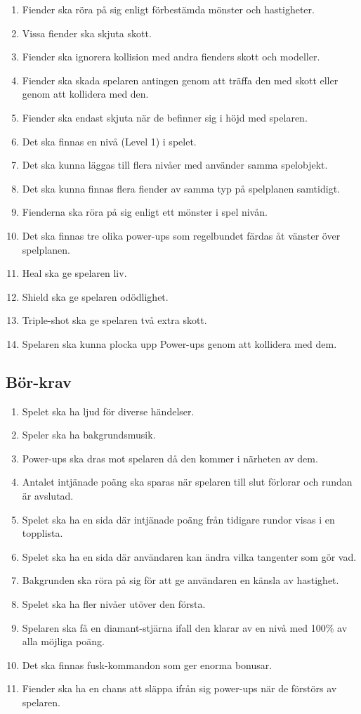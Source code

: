 \documentclass{TDP005mall}
\begin{document}
\begin{enumerate}
\item Fiender ska röra på sig enligt förbestämda mönster och hastigheter.
\item Vissa fiender ska skjuta skott.
\item Fiender ska ignorera kollision med andra fienders skott och modeller.
\item Fiender ska skada spelaren antingen genom att träffa den med skott eller genom att kollidera med den.
\item Fiender ska endast skjuta när de befinner sig i höjd med spelaren.
\item Det ska finnas en nivå (Level 1) i spelet.
\item Det ska kunna läggas till flera nivåer med använder samma spelobjekt.
\item Det ska kunna finnas flera fiender av samma typ på spelplanen samtidigt. %
\item Fienderna ska röra på sig enligt ett mönster i spel nivån.
\item Det ska finnas tre olika power-ups som regelbundet färdas åt vänster över spelplanen.
\item Heal ska ge spelaren liv.
\item Shield ska ge spelaren odödlighet.
\item Triple-shot ska ge spelaren två extra skott. 
\item Spelaren ska kunna plocka upp Power-ups genom att kollidera med dem.
\end{enumerate}

\subsection{Bör-krav}
\begin{enumerate}
\item Spelet ska ha ljud för diverse händelser.
\item Speler ska ha bakgrundsmusik.
\item Power-ups ska dras mot spelaren då den kommer i närheten av dem.
\item Antalet intjänade poäng ska sparas när spelaren till slut förlorar och rundan är avslutad.
\item Spelet ska ha en sida där intjänade poäng från tidigare rundor visas i en topplista.
\item Spelet ska ha en sida där användaren kan ändra vilka tangenter som gör vad.
\item Bakgrunden ska röra på sig för att ge användaren en känsla av hastighet.
\item Spelet ska ha fler nivåer utöver den första.
\item Spelaren ska få en diamant-stjärna ifall den klarar av en nivå med 100\% av alla möjliga poäng.
\item Det ska finnas fusk-kommandon som ger enorma bonusar.
\item Fiender ska ha en chans att släppa ifrån sig power-ups när de förstörs av spelaren.

\end{enumerate}
\end{document}
